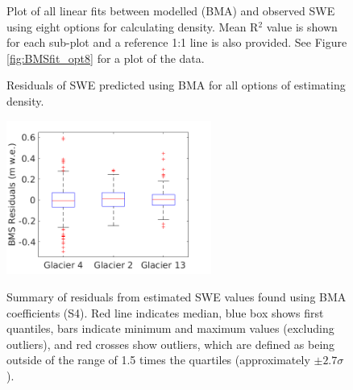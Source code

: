 \documentclass{sfuthesis}
\newcommand{\boxMatlab}{Red line indicates median, blue box shows first quantiles, bars indicate minimum and maximum values (excluding outliers), and red crosses show outliers, which are defined as being outside of the range of 1.5 times the quartiles (approximately $\pm2.7\sigma$). }
\begin{document}
\begin{figure}[H]
	\caption{Plot of all linear fits between modelled (BMA) and observed SWE using eight options for calculating density. Mean R$^2$ value is shown for each sub-plot and a reference 1:1 line is also provided. See Figure \ref{fig:BMSfit_opt8} for a plot of the data. }
	\label{fig:BMSfit_allLines}
\end{figure}

\begin{figure}[H]
	\caption{Residuals of SWE predicted using BMA for all options of estimating density.}
	\label{fig:BMSresiduals_all}
\end{figure}


\begin{figure}[H]
\centering
	\includegraphics[width =0.6\textwidth]{residuals_box_BMS.png}\\
\caption{Summary of residuals from estimated SWE values found using BMA coefficients (S4). \boxMatlab}
\label{fig:BMAresidualsboxplot}
\end{figure} 
\end{document}
